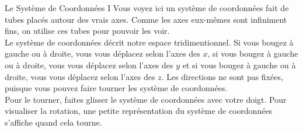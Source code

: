 \begin{surferPage}[Coordonées I]{Le Système de Coordonnées I}
Vous voyez ici un système de coordonnées fait de tubes placés autour des vrais axes. Comme les axes eux-mêmes sont infiniment fins, on utilise ces tubes pour pouvoir les voir.\\
Le système de coordonnées décrit notre espace tridimentionnel. Si vous bougez à gauche ou à droite, vous vous déplacez selon l'axes des $x$, si vous bougez à gauche ou à droite, vous vous déplacez selon l'axes des $y$ et si vous bougez à gauche ou à droite, vous vous déplacez selon l'axes des $z$. Les directions ne sont pas fixées, puisque vous pouvez faire tourner les système de coordonnées.\\
\vspace{0.3cm}
Pour le tourner, faites glisser le système de coordonnées avec votre doigt. Pour visualiser la rotation, une petite représentation du système de coordonnées s'affiche quand cela tourne.
\end{surferPage}

